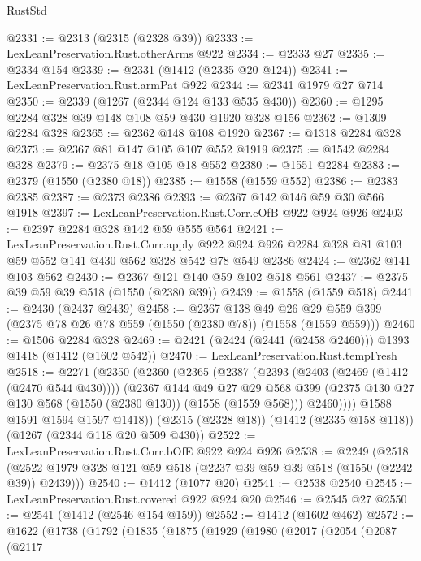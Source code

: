 \begin{lexlean}{RustStd}
\begin{coremodule}
{\begin{coremodule}
{{{{{{{{{{@2331 := @2313 (@2315 (@2328 @39))
@2333 := LexLeanPreservation.Rust.otherArms @922
@2334 := @2333 @27
@2335 := @2334 @154
@2339 := @2331 (@1412 (@2335 @20 @124))
@2341 := LexLeanPreservation.Rust.armPat @922
@2344 := @2341 @1979 @27 @714
@2350 := @2339 (@1267 (@2344 @124 @133 @535 @430))
@2360 := @1295 @2284 @328 @39 @148 @108 @59 @430 @1920 @328 @156
@2362 := @1309 @2284 @328
@2365 := @2362 @148 @108 @1920
@2367 := @1318 @2284 @328
@2373 := @2367 @81 @147 @105 @107 @552 @1919
@2375 := @1542 @2284 @328
@2379 := @2375 @18 @105 @18 @552
@2380 := @1551 @2284
@2383 := @2379 (@1550 (@2380 @18))
@2385 := @1558 (@1559 @552)
@2386 := @2383 @2385
@2387 := @2373 @2386
@2393 := @2367 @142 @146 @59 @30 @566 @1918
@2397 := LexLeanPreservation.Rust.Corr.eOfB @922 @924 @926
@2403 := @2397 @2284 @328 @142 @59 @555 @564
@2421 := LexLeanPreservation.Rust.Corr.apply
    @922
    @924
    @926
    @2284
    @328
    @81
    @103
    @59
    @552
    @141
    @430
    @562
    @328
    @542
    @78
    @549
    @2386
@2424 := @2362 @141 @103 @562
@2430 := @2367 @121 @140 @59 @102 @518 @561
@2437 := @2375 @39 @59 @39 @518 (@1550 (@2380 @39))
@2439 := @1558 (@1559 @518)
@2441 := @2430 (@2437 @2439)
@2458 := @2367
    @138
    @49
    @26
    @29
    @559
    @399
    (@2375 @78 @26 @78 @559 (@1550 (@2380 @78)) (@1558 (@1559 @559)))
@2460 := @1506 @2284 @328
@2469 := @2421 (@2424 (@2441 (@2458 @2460))) @1393 @1418 (@1412 (@1602 @542))
@2470 := LexLeanPreservation.Rust.tempFresh
@2518 := @2271
    (@2350
      (@2360
        (@2365
          (@2387
            (@2393
              (@2403 (@2469 (@1412 (@2470 @544 @430))))
              (@2367
                @144
                @49
                @27
                @29
                @568
                @399
                (@2375 @130 @27 @130 @568 (@1550 (@2380 @130)) (@1558 (@1559 @568)))
                @2460))))
        @1588
        @1591
        @1594
        @1597
        @1418))
    (@2315 (@2328 @18))
    (@1412 (@2335 @158 @118))
    (@1267 (@2344 @118 @20 @509 @430))
@2522 := LexLeanPreservation.Rust.Corr.bOfE @922 @924 @926
@2538 := @2249
    (@2518 (@2522 @1979 @328 @121 @59 @518 (@2237 @39 @59 @39 @518 (@1550 (@2242 @39)) @2439)))
@2540 := @1412 (@1077 @20)
@2541 := @2538 @2540
@2545 := LexLeanPreservation.Rust.covered @922 @924 @20
@2546 := @2545 @27
@2550 := @2541 (@1412 (@2546 @154 @159))
@2552 := @1412 (@1602 @462)
@2572 := @1622
    (@1738
      (@1792
        (@1835
          (@1875
            (@1929
              (@1980
                (@2017
                  (@2054
                    (@2087
                      (@2117
}}}}}}}}}}
\end{coremodule}}
\end{coremodule}
\end{lexlean}
